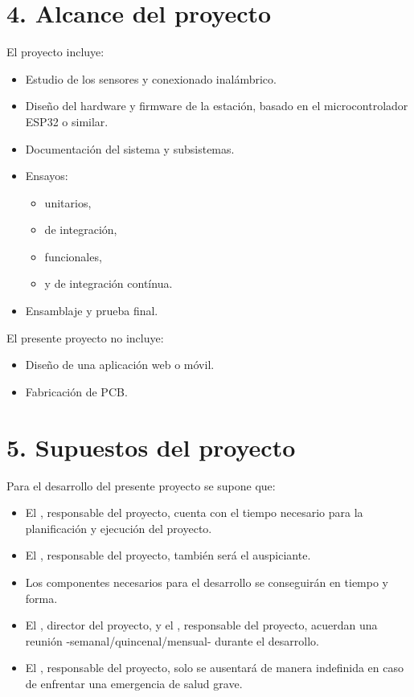 \documentclass[
11pt, %
]{charter}
\begin{document}
\section{4. Alcance del proyecto}
\label{sec:alcance}

El proyecto incluye:
\begin{itemize}
	\item Estudio de los sensores y conexionado inalámbrico.
	\item Diseño del hardware y firmware de la estación, basado en el microcontrolador ESP32 o similar.
	\item Documentación del sistema y subsistemas.
	\item Ensayos:
	\begin{itemize}
		\item unitarios,
		\item de integración,
		\item funcionales,
		\item y de integración contínua.
		\end{itemize}
	\item Ensamblaje y prueba final.
	
\end{itemize}

\newpage
El presente proyecto no incluye:

\begin{itemize}
	\item Diseño de una aplicación web o móvil.
	\item Fabricación de PCB.
	
\end{itemize}

\section{5. Supuestos del proyecto}
\label{sec:supuestos}

Para el desarrollo del presente proyecto se supone que:

\begin{itemize}
	\item El \authorname, responsable del proyecto, cuenta con el tiempo necesario para
la planificación y ejecución del proyecto.
	\item El \authorname, responsable del proyecto, también será el auspiciante.
	\item Los componentes necesarios para el desarrollo se conseguirán en tiempo y forma.
	\item El \supname, director del proyecto, y el \authorname, responsable del
proyecto, acuerdan una reunión -semanal/quincenal/mensual- durante el desarrollo.
	\item El \authorname, responsable del proyecto, solo se ausentará de manera indefinida en caso de enfrentar una emergencia de salud grave.
\end{itemize}
\end{document}
